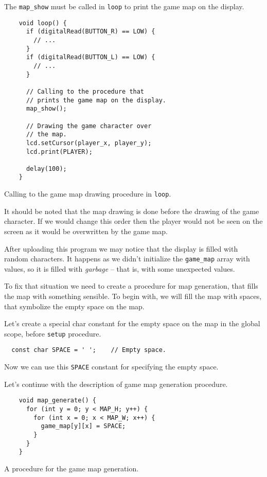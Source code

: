 \documentclass[../sparc.tex]{subfiles}
\begin{document}
The \texttt{map_show} must be called in \texttt{loop} to print
the game map on the display.

\begin{listing}[H]
  \begin{verbatim}
    void loop() {
      if (digitalRead(BUTTON_R) == LOW) {
        // ...
      }
      if (digitalRead(BUTTON_L) == LOW) {
        // ...
      }

      // Calling to the procedure that
      // prints the game map on the display.
      map_show();

      // Drawing the game character over
      // the map.
      lcd.setCursor(player_x, player_y);
      lcd.print(PLAYER);

      delay(100);
    }
  \end{verbatim}
  \caption{Calling to the game map drawing procedure in \texttt{loop}.}
  \label{listing:game-dev-map-show-call}
\end{listing}

It should be noted that the map drawing is done before the drawing of the game
character.  If we would change this order then the player would not be seen on
the screen as it would be overwritten by the game map.

After uploading this program we may notice that the display is filled with
random characters.  It happens as we didn't initialize the
\texttt{game_map} array with values, so it is filled with
\emph{garbage} -- that is, with some unexpected values.

To fix that situation we need to create a procedure for map generation, that
fills the map with something sensible.  To begin with, we will fill the map with
spaces, that symbolize the empty space on the map.

Let's create a special char constant for the empty space on the map in the
global scope, before \texttt{setup} procedure.

\begin{verbatim}
  const char SPACE = ' ';    // Empty space.
\end{verbatim}

Now we can use this \texttt{SPACE} constant for specifying the empty
space.

Let's continue with the description of game map generation procedure.

\begin{listing}[H]
  \begin{verbatim}
    void map_generate() {
      for (int y = 0; y < MAP_H; y++) {
        for (int x = 0; x < MAP_W; x++) {
          game_map[y][x] = SPACE;
        }
      }
    }
  \end{verbatim}
  \caption{A procedure for the game map generation.}
  \label{listing:game-dev-map-generate}
\end{listing}
\end{document}
